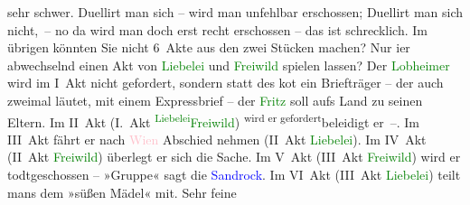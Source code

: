                sehr schwer. Duellirt man sich – wird man unfehlbar erschossen; Duellirt man sich
               nicht, – no da wird man doch erst recht erschossen – das ist schrecklich. Im übrigen
               könnten Sie nicht 6 Akte aus den zwei Stücken {\pb}machen? Nur i{\geminationm}er abwechselnd einen Akt von \textcolor{green}{Liebelei}{}\ledrightnote{\textcolor{green}{Liebelei. Schauspiel in drei Akten}} und \textcolor{green}{Freiwild}{}\ledrightnote{\textcolor{green}{Freiwild. Schauspiel in 3 Akten}} spielen
               lassen?\pend
           \pstart
           Der \textcolor{green}{Lobheimer}{} wird im I Akt nicht
               gefordert, sondern statt des \label{K_L00594_1v}\label{K_L00594_1h} ko{\geminationm}t ein Briefträger – der auch zweimal läutet, {\pb}mit einem Expressbrief – der \strikeout{\textcolor{blue}{Pau}{}\ledrightnote{\textcolor{blue}{Paul Goldmann}}}{ }\textcolor{green}{Fritz}{} soll aufs Land zu seinen
               Eltern. Im II Akt (I. Akt \substVorne{}\textsuperscript{\textcolor{green}{Liebelei}{}\ledrightnote{\textcolor{green}{Liebelei. Schauspiel in drei Akten}}}{\allowbreak}\substDazwischen{}\textcolor{green}{Freiwild}{}\ledrightnote{\textcolor{green}{Freiwild. Schauspiel in 3 Akten}}\substHinten{}) \substVorne{}\textsuperscript{wird er gefordert}{\allowbreak}\substDazwischen{}beleidigt er –\substHinten{}.\pend
           \pstart
           Im III Akt fährt er nach \textcolor{pink}{Wien}{}\ledrightnote{\textcolor{pink}{Wien}} Abschied nehmen (II Akt
                  \textcolor{green}{Liebelei}{}\ledrightnote{\textcolor{green}{Liebelei. Schauspiel in drei Akten}}).\pend
           \pstart
           Im IV Akt (II Akt {\pb}\textcolor{green}{Freiwild}{}\ledrightnote{\textcolor{green}{Freiwild. Schauspiel in 3 Akten}}) überlegt er sich die Sache. Im V Akt
               (III Akt \textcolor{green}{Freiwild}{}\ledrightnote{\textcolor{green}{Freiwild. Schauspiel in 3 Akten}}) wird er todtgeschossen –
               »Gruppe« sagt die \textcolor{blue}{Sandrock}{}\ledrightnote{\textcolor{blue}{Adele Sandrock}}. Im VI Akt (III Akt
                  \textcolor{green}{Liebelei}{}\ledrightnote{\textcolor{green}{Liebelei. Schauspiel in drei Akten}}) teilt mans {\pb}dem »süßen Mädel« mit. Sehr feine
